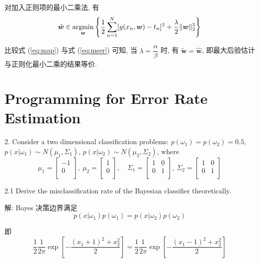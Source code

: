 \documentclass{article}
\begin{document}
对加入正则项的最小二乘法, 有
\begin{equation}
  \label{eq:mser}
  \tilde{\bm{w}}\in\operatorname*{argmin}_{\bm{w}}\left\{\frac{1}{2}\sum_{n=1}^N[y(x_n,\bm{w})-t_n]^2+\frac{\lambda}{2} \|\bm{w}\|_2^2\right\}
\end{equation}

比较式 (\ref{eq:map}) 与式 (\ref{eq:mser}) 可知, 当 $\lambda=\dfrac{\alpha}{\beta}$ 时, 有 $\tilde{\bm{w}}=\hat{\bm{w}}$, 即最大后验估计与正则化最小二乘的结果等价.

\section*{Programming for Error Rate Estimation}

2. Consider a two dimensional classification problems: $p(\omega_{1})=p(\omega_{2})= 0.5$, $p(x|\omega_{1}) \sim N(\mu_{1},\Sigma_{1})$, $p(x|\omega_{2}) \sim N(\mu_{2},\Sigma_{2})$, where
\begin{equation}
  \mu_1=
    \begin{bmatrix}
      -1 \\ 
      0 \\
    \end{bmatrix},~
  \mu_2=
    \begin{bmatrix}
      1 \\ 
      0 \\
    \end{bmatrix},\quad
  \Sigma_1=
    \begin{bmatrix}
      1 & 0 \\
      0 & 1 \\
    \end{bmatrix},~
  \Sigma_2=
    \begin{bmatrix}
      1 & 0 \\
      0 & 1 \\
    \end{bmatrix}
\end{equation}

2.1 Derive the misclassification rate of the Bayesian classifier theoretically.

解: Bayes 决策边界满足
\begin{equation}
  p(x|\omega_{1})p(\omega_{1})=p(x|\omega_{2})p(\omega_{2})
\end{equation}

即
\begin{equation}
  \frac{1}{2}\frac{1}{2\pi}\exp\left[-\frac{(x_1+1)^2+x_2^2}{2}\right]=\frac{1}{2}\frac{1}{2\pi}\exp\left[-\frac{(x_1-1)^2+x_2^2}{2}\right]
\end{equation}
\end{document}
